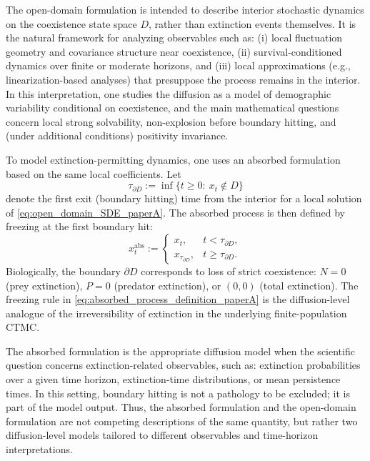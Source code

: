 \documentclass[pdflatex,sn-mathphys-ay]{sn-jnl}
\theoremstyle{thmstyleone}
\theoremstyle{definition}
\theoremstyle{remark}
\begin{document}
The open-domain formulation is intended to describe interior stochastic dynamics on the coexistence state space \(D\), rather than extinction events themselves. It is the natural framework for analyzing observables such as:
(i) local fluctuation geometry and covariance structure near coexistence,
(ii) survival-conditioned dynamics over finite or moderate horizons,
and (iii) local approximations (e.g., linearization-based analyses) that presuppose the process remains in the interior. In this interpretation, one studies the diffusion as a model of demographic variability conditional on coexistence, and the main mathematical questions concern local strong solvability, non-explosion before boundary hitting, and (under additional conditions) positivity invariance.

To model extinction-permitting dynamics, one uses an absorbed formulation based on the same local coefficients. Let
\begin{equation}
\label{eq:tau_boundary_paperA}
\tau_{\partial D}:=\inf\{t\ge 0:\ x_t\notin D\}
\end{equation}
denote the first exit (boundary hitting) time from the interior for a local solution of \eqref{eq:open_domain_SDE_paperA}. The absorbed process is then defined by freezing at the first boundary hit:
\begin{equation}
\label{eq:absorbed_process_definition_paperA}
x_t^{\mathrm{abs}}:=
\begin{cases}
x_t, & t<\tau_{\partial D},\\[4pt]
x_{\tau_{\partial D}}, & t\ge \tau_{\partial D}.
\end{cases}
\end{equation}
Biologically, the boundary \(\partial D\) corresponds to loss of strict coexistence:
\(N=0\) (prey extinction), \(P=0\) (predator extinction), or \((0,0)\) (total extinction). The freezing rule in \eqref{eq:absorbed_process_definition_paperA} is the diffusion-level analogue of the irreversibility of extinction in the underlying finite-population CTMC.

The absorbed formulation is the appropriate diffusion model when the scientific question concerns extinction-related observables, such as:
extinction probabilities over a given time horizon, extinction-time distributions, or mean persistence times. In this setting, boundary hitting is not a pathology to be excluded; it is part of the model output. Thus, the absorbed formulation and the open-domain formulation are not competing descriptions of the same quantity, but rather two diffusion-level models tailored to different observables and time-horizon interpretations.
\end{document}
